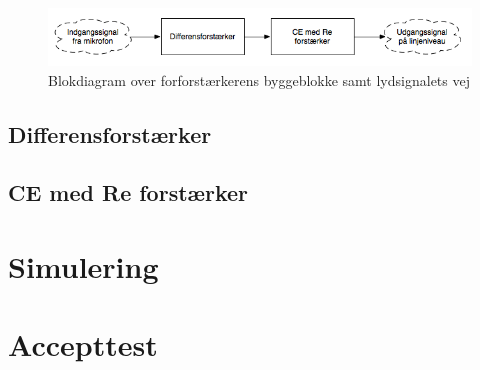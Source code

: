\begin{figure}[h]
\centering
\includegraphics[scale=.6]{implementering/forforstaerker/blok_forforstaerker.png}
\caption{Blokdiagram over forforstærkerens byggeblokke samt lydsignalets vej}
\label{blok_forforstaerker}
\end{figure}

\subsection{Differensforstærker}

\subsection{CE med Re forstærker}


\section{Simulering}


\section{Accepttest}

